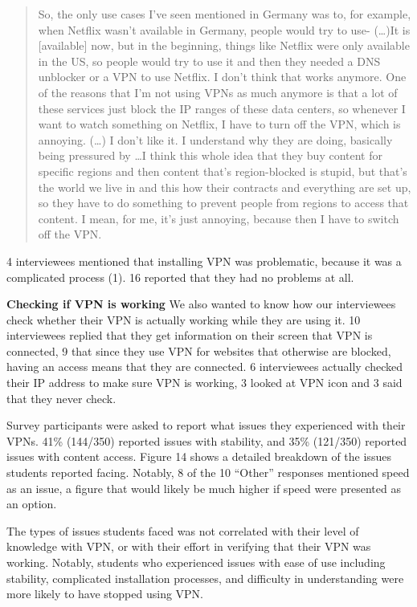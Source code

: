 \begin{quote}So, the only use cases I've seen mentioned in Germany was to, for
example, when Netflix wasn't available in Germany, people would try to use-
(\dots)It is [available] now, but in the beginning, things like Netflix were
only available in the US, so people would try to use it and then they needed a
DNS unblocker or a VPN to use Netflix. I don't think that works anymore. One
of the reasons that I'm not using VPNs as much anymore is that a lot of these
services just block the IP ranges of these data centers, so whenever I want to
watch something on Netflix, I have to turn off the VPN, which is annoying.
(\dots) I don't like it. I understand why they are doing, basically being
pressured by \dots I think this whole idea that they buy content for specific
regions and then content that's region-blocked is stupid, but that's the world
we live in and this how their contracts and everything are set up, so they
have to do something to prevent people from regions to access that content. I
mean, for me, it's just annoying, because then I have to switch off the VPN.
\end{quote}


4 interviewees mentioned that installing VPN was problematic, because it was a
complicated process (1). 16 reported that they had no problems at all. 

\textbf{Checking if VPN is working} We also wanted to know how our
interviewees check whether their VPN is actually working while they are using
it. 10 interviewees replied that they get information on their screen that VPN
is connected, 9 that since they use VPN for websites that otherwise are
blocked, having an access means that they are connected. 6 interviewees
actually checked their IP address to make sure VPN is working, 3 looked at VPN
icon and 3 said that they never check. 

Survey participants were asked to report what issues they experienced with
their VPNs. 41\% (144/350) reported issues with stability, and 35\% (121/350)
reported issues with content access. Figure 14 shows a detailed breakdown of
the issues students reported facing. Notably, 8 of the 10 “Other” responses
mentioned speed as an issue, a figure that would likely be much higher if
speed were presented as an option.

The types of issues students faced was not correlated with their level of
knowledge with VPN, or with their effort in verifying that their VPN was
working. Notably, students who experienced issues with ease of use including
stability, complicated installation processes, and difficulty in understanding
were more likely to have stopped using VPN.

